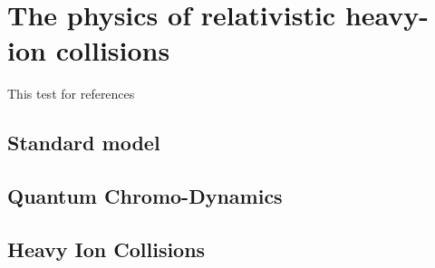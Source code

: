 \section{The physics of relativistic heavy-ion collisions}
This test for references \cite{Hahn:1986mb}
\subsection{Standard model}
\subsection{Quantum Chromo-Dynamics}
\subsection{Heavy Ion Collisions}

